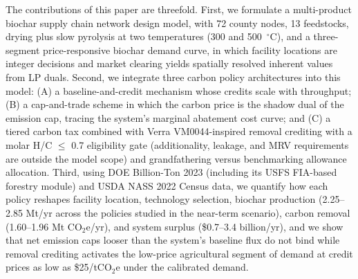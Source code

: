 The contributions of this paper are threefold. First, we formulate a
multi-product biochar supply chain network design model, with 72 county nodes,
13 feedstocks, drying plus slow pyrolysis at two temperatures (300 and
500~$^\circ$C), and a three-segment price-responsive biochar demand curve, in
which facility locations are integer decisions and market clearing yields
spatially resolved inherent values from LP duals. Second, we integrate three
carbon policy architectures into this model: (A) a baseline-and-credit mechanism
whose credits scale with throughput; (B) a cap-and-trade scheme in which the
carbon price is the shadow dual of the emission cap, tracing the
system's marginal abatement cost curve; and (C) a tiered carbon tax combined with
Verra VM0044-inspired removal crediting with a molar H/C $\leq$ 0.7
eligibility gate (additionality, leakage, and MRV requirements are outside the
model scope) and
grandfathering versus benchmarking allowance allocation. Third, using DOE
Billion-Ton 2023 (including its USFS FIA-based forestry module) and USDA NASS
2022 Census data, we quantify how each
policy reshapes facility location, technology selection, biochar production
(2.25--2.85 Mt/yr across the policies studied in the near-term scenario),
carbon removal (1.60--1.96 Mt
CO$_2$e/yr), and system surplus (\$0.7--3.4 billion/yr), and we show that net
emission caps looser than the system's baseline flux do not bind while removal
crediting
activates the low-price agricultural segment of demand at credit prices as low as
\$25/tCO$_2$e under the calibrated demand.

